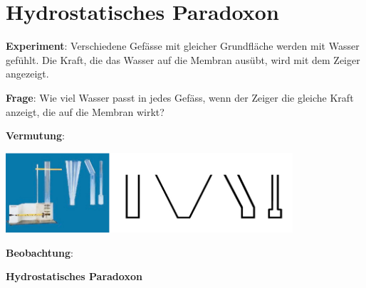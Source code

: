 \documentclass[11pt]{article}
\begin{document}

% 


\newpage

\section*{Hydrostatisches Paradoxon}


\textbf{Experiment}: 
Verschiedene Gefässe mit gleicher Grundfläche werden mit Wasser gefühlt. Die Kraft, die das Wasser auf die Membran ausübt, wird mit dem Zeiger angezeigt.

 \textbf{Frage}: Wie viel Wasser passt in jedes Gefäss, wenn der Zeiger die gleiche Kraft anzeigt, die auf die Membran wirkt?

\textbf{Vermutung}: 

\begin{center}
    \includegraphics[width=0.8\textwidth]{images/Experiment_hight.jpg}
\end{center}

\textbf{Beobachtung}: 
    \vspace{1cm}

\begin{tcolorbox}[width=\textwidth, %
        colback=white,colframe=gray!75!black]
        \textbf{Hydrostatisches Paradoxon}
        \vspace{1.5cm}
\end{tcolorbox}
\end{document}
